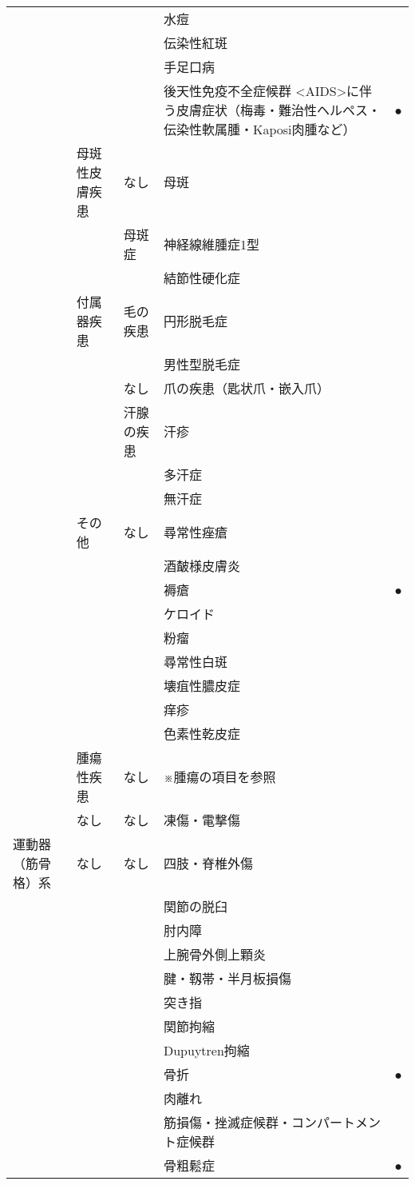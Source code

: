 \begin{xltabular}{\linewidth}{XXXXX}
 &  &  & 水痘 &  \\
 &  &  & 伝染性紅斑 &  \\
 &  &  & 手足口病 &  \\
 &  &  & 後天性免疫不全症候群 <AIDS>に伴う皮膚症状（梅毒・難治性ヘルペス・伝染性軟属腫・Kaposi肉腫など） & ● \\
 & 母斑性皮膚疾患 & なし & 母斑 &  \\
 &  & 母斑症 & 神経線維腫症1型 &  \\
 &  &  & 結節性硬化症 &  \\
 & 付属器疾患 & 毛の疾患 & 円形脱毛症 &  \\
 &  &  & 男性型脱毛症 &  \\
 &  & なし & 爪の疾患（匙状爪・嵌入爪） &  \\
 &  & 汗腺の疾患 & 汗疹 &  \\
 &  &  & 多汗症 &  \\
 &  &  & 無汗症 &  \\
 & その他 & なし & 尋常性痤瘡 &  \\
 &  &  & 酒皶様皮膚炎 &  \\
 &  &  & 褥瘡 & ● \\
 &  &  & ケロイド &  \\
 &  &  & 粉瘤 &  \\
 &  &  & 尋常性白斑 &  \\
 &  &  & 壊疽性膿皮症 &  \\
 &  &  & 痒疹 &  \\
 &  &  & 色素性乾皮症 &  \\
 & 腫瘍性疾患 & なし & ※腫瘍の項目を参照 &  \\
 & なし & なし & 凍傷・電撃傷 &  \\
運動器（筋骨格）系 & なし & なし & 四肢・脊椎外傷 &  \\
 &  &  & 関節の脱臼 &  \\
 &  &  & 肘内障 &  \\
 &  &  & 上腕骨外側上顆炎 &  \\
 &  &  & 腱・靱帯・半月板損傷 &  \\
 &  &  & 突き指 &  \\
 &  &  & 関節拘縮 &  \\
 &  &  & Dupuytren拘縮 &  \\
 &  &  & 骨折 & ● \\
 &  &  & 肉離れ &  \\
 &  &  & 筋損傷・挫滅症候群・コンパートメント症候群 &  \\
 &  &  & 骨粗鬆症 & ● \\

\end{xltabular}
